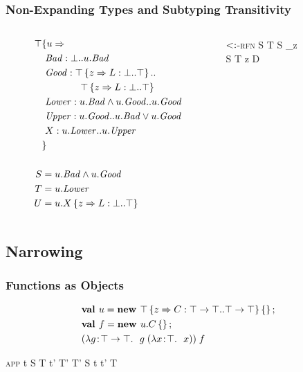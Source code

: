 \documentclass{beamer}
\begin{document}
\begin{frame}
\frametitle{Non-Expanding Types and Subtyping Transitivity}
\begin{columns}
\begin{column}[m]{5cm}
\begin{align*}
\top & \{u \Rightarrow \\
&\ \mathit{Bad} : \bot..u.\mathit{Bad}\\
&\ \mathit{Good} : \top \left\{z \Rightarrow L : \bot..\top \right\}..\\&\quad\quad\quad\quad\top \left\{z \Rightarrow L : \bot..\top \right\}\\
&\ \mathit{Lower} : u.\mathit{Bad} \wedge u.\mathit{Good}..u.\mathit{Good}\\
&\ \mathit{Upper} : u.\mathit{Good}..u.\mathit{Bad} \vee u.\mathit{Good}\\
&\ X : u.\mathit{Lower}..u.\mathit{Upper}\\
& \}\\
\\
S &= u.\mathit{Bad} \wedge u.\mathit{Good}\\
T &= u.\mathit{Lower}\\
U &= u.X \left\{z \Rightarrow L : \bot..\top \right\}
\end{align*}
\end{column}
\begin{column}[m]{5cm}
\begin{block}{\textsc{$<:$-rfn}}
  \infrule
   {\Gamma \ts S \sub T \spcomma S \expand_z  \\
   \Gamma {} \ts {}}
   {\Gamma \ts S \sub T  z {\seq D}}
\end{block}
\end{column}
\end{columns}
\end{frame}

\subsection{Narrowing}

\begin{frame}
\frametitle{Functions as Objects}
\begin{align*}
&\mlnew u {\Top \refine z {\Ldecl C {\Top \tfun \Top} {\Top \tfun \Top}} \ldefs{}} {
\mlnew f {u.C \ldefs{}} {
\app {(\abs g {\Top \tfun \Top} {\app g (\abs x \Top x)})} f
}}
\end{align*}
\begin{block}{\textsc{app}}
  \infrule
  {\Gamma \ts t \typ  S \tfun T \spcomma t' \typ T' \spcomma T' \sub S}
  {\Gamma \ts \app t {t'} \typ T}
\end{block}
\end{frame}
\end{document}
